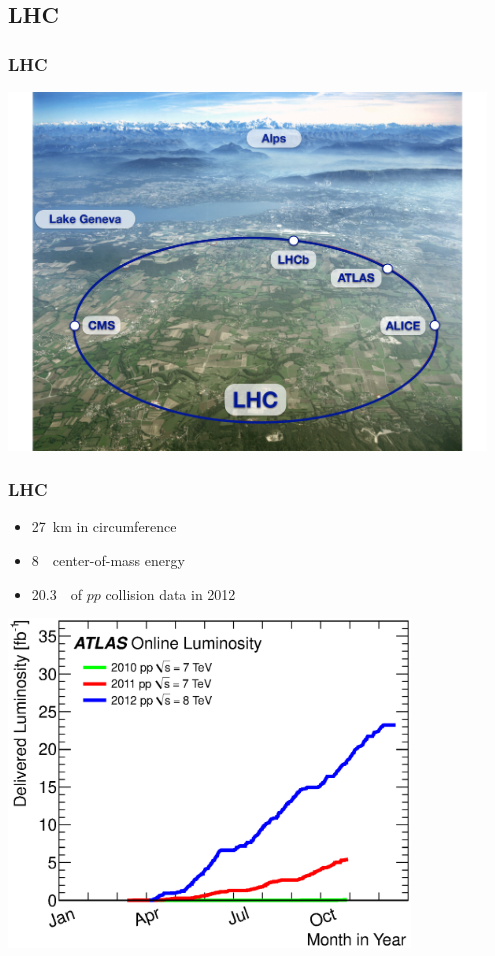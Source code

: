 \documentclass[10pt, svgnames]{beamer}
\begin{document}
\subsection{LHC}

\begin{frame}
  \frametitle{LHC}
  \begin{center}
    \includegraphics[width=0.95\textwidth]
    {figures/lhc_and_atlas/lhc_aerial.pdf}
  \end{center}
\end{frame}

\begin{frame}
  \frametitle{LHC}
  \begin{itemize}
    \item 27~km in circumference
    \item 8~\TeV\ center-of-mass energy
    \item 20.3~\ifb\ of $pp$ collision data in 2012
  \end{itemize}
  \begin{center}
    \includegraphics[width=0.8\textwidth]
    {figures/lhc_and_atlas/intlumivsyear.eps}
  \end{center}
\end{frame}
\end{document}
